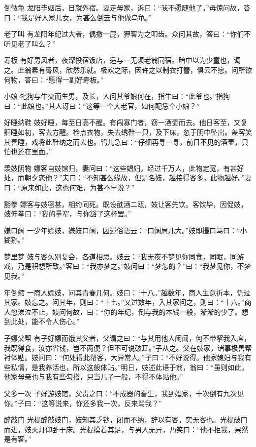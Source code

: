 \documentclass[12pt,UTF8]{ctexbook}
\begin{document}
倒做龟
龙阳毕姻后，日就外宿。妻走母家，诉曰：“我不愿随他了。”母惊问故，答曰：“我是好人家儿女，为甚么倒去与他做乌龟。”

老了叫
有龙阳年纪过大者，偶撒一屁，狎客为之叩齿。众问其故，答曰：“你们不听见老了叫么？”

寿板
有好男风者，夜深投宿饭店，适与一无须老翁同宿。暗中以为少童也，调之。此翁素有臀风，欣然乐就。极欢之际，因许之以制衣打簪，俱云不愿。问所欲何物，答曰：“愿得一副好寿板。”

小娘
牝狗与牛交而生男，及长，人问其爷娘何在，指牛曰：“此爷也。”指狗曰：“此娘也。”其人讶曰：“这等一个大老官，如何配恁个小娘？”

好睡纳鞋
妓好睡，每至日高不醒。有闯寡门者，窃一酒壶而去。他日客至，又复鼾睡如初，客去方醒。检点衣物，失去绣鞋一只，及下床，忽于阴中坠出。盖客笑其善睡，戏将此鞋纳之而去也。鸨儿急曰：“仔细再寻一寻，前日不见的酒壶，只怕也还在里面。”

羡妓阴物
嫖客自妓馆归，妻问曰：“这些娼妇，经过千万人，此物定宽，有甚好处，而朝夕恋他？”夫曰：“不知甚么缘故，但是名妓，越接得客多，此物越好。”妻曰：“原来如此，这也何难，为甚不早说？”

豁拳
嫖客与妓密甚，相约同死。既设酖酒二瓯，妓让客先饮。客饮毕，因促妓，妓伸拳曰：“我的量窄，与你豁了这杯罢。”

嫌口阔
一少年嫖妓，嫌妓口阔，因述俗语云：“口阔屄儿大。”妓即撮口骂曰：“小猢狲。”

梦里梦
妓与客久别复会，各道相思。妓云：“我无夜不梦见你同食，同眠，同游戏，乃是积想所致。”客曰：“我亦梦之。”妓问曰：“梦怎的？”曰：“我梦见你，不梦见我。”

年倒缩
一商人嫖妓，问其青春几何。妓曰：“十八。”越数年，商人生意折本，仍过其家。妓忘之。问其年，则曰：“十七。”又过数年，入其家问之，则曰：“十六。”商人忽涕泣不止，妓问何故，曰：“你的年纪，倒与我的本钱一般，渐渐的少了。想到此处，能不令人伤心。”

子嫖父帮
有子好嫖而饿其父者，父谓之曰：“与其用他人闲闻，何不带挈我入席，我既得食，汝亦省钱，岂不两便？但不可说破耳。”子从之。父在妓家，诸事极善帮衬体贴。妓问曰：“何处得此帮客，大异常人。”子曰：“不好说得。他家媳妇与我有些私情，是我养活也，所以这般体贴。”明日，妓述此语于翁，翁曰：“虽则如此，他家母亲也与我有些勾搭，只当儿子一般，不得不体贴他。”

父多一次
子好游妓馆，父责之曰：“不成器的畜生，我到娼家，十次倒有九次见你。”子曰：“这等说来，你还多我一次，反来骂我？”

醉敲门
光棍醉敲妓门，妓知其乏钞，闭而不纳，辞以有客，实无客也。光棍破门而进，妓灭灯仰卧于床。光棍摸着其足，与男人无异，乃笑曰：“他不拒我，果然是有客。”
\end{document}
